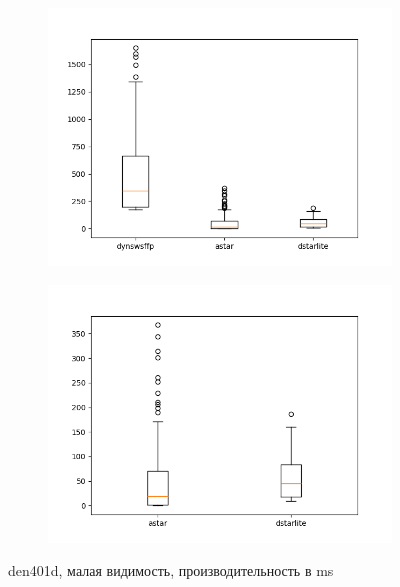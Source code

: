 \documentclass[11pt]{article}
\begin{document}
    \begin{figure}
        \centering
        \begin{subfigure}[b]{0.48\textwidth}
            \centering
            \includegraphics[width=\textwidth]{../plots/r5/den401d-('dynswsffp', 'astar', 'dstarlite').png}
        \end{subfigure}
        \hfill
        \begin{subfigure}[b]{0.48\textwidth}
            \centering
            \includegraphics[width=\textwidth]{../plots/r5/den401d-('astar', 'dstarlite').png}
        \end{subfigure}
        \caption{den401d, малая видимость, производительность в ms}
        \label{fig: den401d-r5}
    \end{figure}
\end{document}
